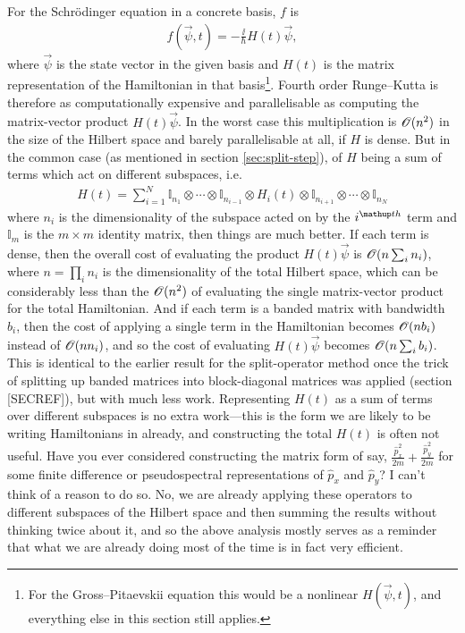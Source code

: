 For the Schr\"odinger equation in a concrete basis, $f$ is
\begin{align}
f(\vec \psi, t) = -\frac\ii\hbar H(t)\vec \psi,
\end{align}
where $\vec \psi$ is the state vector in the given basis and $H(t)$ is the matrix representation of the Hamiltonian in that basis\footnote{For the Gross--Pitaevskii equation this would be a nonlinear $H(\vec \psi, t)$, and everything else in this section still applies.}. Fourth order Runge--Kutta is therefore as computationally expensive and parallelisable as computing the matrix-vector product $H(t)\vec\psi$. In the worst case this multiplication is $\mathscr{O}(n^2)$ in the size of the Hilbert space and barely parallelisable at all, if $H$ is dense. But in the common case (as mentioned in section \ref{sec:split-step}), of $H$ being a sum of terms which act on different subspaces, i.e.
\begin{align}
H(t) = \sum_{i=1}^N \mathbb{I}_{n_1} \otimes \cdots  \otimes \mathbb{I}_{n_{i-1}}
\otimes  H_i(t) \otimes  
 \mathbb{I}_{n_{i+1}} \otimes \cdots \otimes \mathbb{I}_{n_N}
\end{align}
where $n_i$ is the dimensionality of the subspace acted on by the $i^\up{th}$ term and $\mathbb{I}_m$ is the $m\times m$ identity matrix, then things are much better. If each term is dense, then the overall cost of evaluating the product $H(t)\vec\psi$ is $\mathscr{O}(n\sum_i n_i)$, where $n = \prod_i n_i$ is the dimensionality of the total Hilbert space, which can be considerably less than the $\mathscr{O}(n^2)$ of evaluating the single  matrix-vector product for the total Hamiltonian. And if each term is a banded matrix with bandwidth $b_i$, then the cost of applying a single term in the Hamiltonian becomes $\mathscr{O}(n b_i)$ instead of $\mathscr{O}(n n_i)$, and so the cost of evaluating $H(t)\vec\psi$ becomes $\mathscr{O}(n\sum_i b_i)$. This is identical to the earlier result for the split-operator method once the trick of splitting up banded matrices into block-diagonal matrices was applied (section [SECREF]), but with much less work. Representing $H(t)$ as a sum of terms over different subspaces is no extra work---this is the form we are likely to be writing Hamiltonians in already, and constructing the total $H(t)$ is often not useful. Have you ever considered constructing the matrix form of say, $\frac {\hat p_x^2} {2m} + \frac {\hat p_y^2} {2m}$ for some finite difference or pseudospectral representations of $\hat p_x$ and $\hat p_y$? I can't think of a reason to do so. No, we are already applying these operators to different subspaces of the Hilbert space and then summing the results without thinking twice about it, and so the above analysis mostly serves as a reminder that what we are already doing most of the time is in fact very efficient. 

